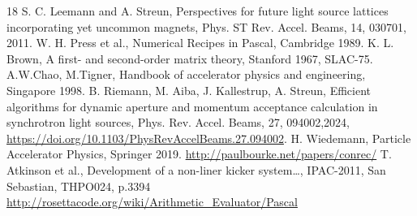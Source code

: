 \documentclass[12pt]{article}
\begin{document}
\begin{thebibliography}{18}
S. C. Leemann and A. Streun, Perspectives for future light source lattices incorporating yet uncommon magnets, Phys. ST Rev. Accel. Beams, 14, 030701, 2011.
W. H. Press et al., Numerical Recipes in Pascal, Cambridge 1989.
K. L. Brown, A first- and second-order matrix theory, Stanford 1967, SLAC-75.
A.W.Chao, M.Tigner, Handbook of accelerator physics and engineering, Singapore 1998.
B. Riemann, M. Aiba, J. Kallestrup, A. Streun, Efficient algorithms for dynamic aperture and momentum acceptance calculation in synchrotron light sources, Phys. Rev. Accel. Beams, 27, 094002,2024, \url{https://doi.org/10.1103/PhysRevAccelBeams.27.094002}.
H. Wiedemann, Particle Accelerator Physics, Springer 2019.
\url{http://paulbourke.net/papers/conrec/}
T. Atkinson et al., Development of a non-liner kicker system\dots , IPAC-2011, San Sebastian, THPO024, p.3394
\url{http://rosettacode.org/wiki/Arithmetic\_Evaluator/Pascal}
\end{thebibliography}
\end{document}
